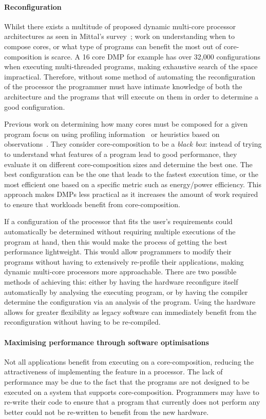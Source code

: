 \paragraph*{Reconfiguration}
Whilst there exists a multitude of proposed dynamic multi-core processor architectures as seen in Mittal's survey~\cite{MittalSurv2016}; work on understanding when to compose cores, or what type of programs can benefit the most out of core-composition is scarce.
A 16 core DMP for example has over 32,000 configurations when executing multi-threaded programs, making exhaustive search of the space impractical.
Therefore, without some method of automating the reconfiguration of the processor the programmer must have intimate knowledge of both the architecture and the programs that will execute on them in order to determine a good configuration.

Previous work on determining how many cores must be composed for a given program focus on using profiling information~\cite{pricopiSchedCoreComp2014} or heuristics based on observations~\cite{gulati2008multitaskingdmc}.
They consider core-composition to be a \textit{black box}: instead of trying to understand what features of a program lead to good performance, they evaluate it on different core-composition sizes and determine the best one.
The best configuration can be the one that leads to the fastest execution time, or the most efficient one based on a specific metric such as energy/power efficiency.
This approach makes DMPs less practical as it increases the amount of work required to ensure that workloads benefit from core-composition.

If a configuration of the processor that fits the user's requirements could automatically be determined without requiring multiple executions of the program at hand, then this would make the process of getting the best performance lightweight.
This would allow programmers to modify their programs without having to extensively re-profile their applications, making dynamic multi-core processors more approachable.
There are two possible methods of achieving this: either by having the hardware reconfigure itself automatically by analysing the executing program, or by having the compiler determine the configuration via an analysis of the program.
Using the hardware allows for greater flexibility as legacy software can immediately benefit from the reconfiguration without having to be re-compiled.
\vspace{-1em}
\paragraph*{Maximising performance through software optimisations}
Not all applications benefit from executing on a core-composition, reducing the attractiveness of implementing the feature in a processor.
The lack of performance may be due to the fact that the programs are not designed to be executed on a system that supports core-composition.
Programmers may have to re-write their code to ensure that a program that currently does not perform any better could not be re-written to benefit from the new hardware.


